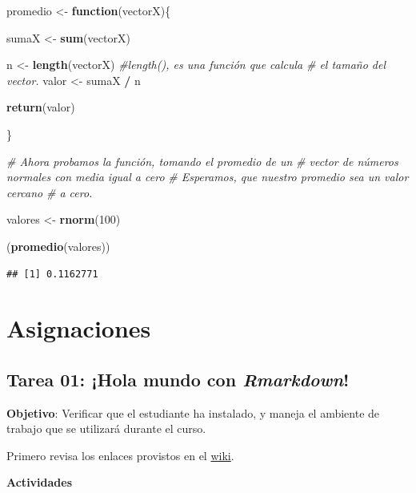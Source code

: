 \documentclass[12pt,letterpaper,]{book}
\newenvironment{Shaded}{\begin{snugshade}}{\end{snugshade}}
\newcommand{\KeywordTok}[1]{\textcolor[rgb]{0.13,0.29,0.53}{\textbf{#1}}}
\newcommand{\DecValTok}[1]{\textcolor[rgb]{0.00,0.00,0.81}{#1}}
\newcommand{\StringTok}[1]{\textcolor[rgb]{0.31,0.60,0.02}{#1}}
\newcommand{\CommentTok}[1]{\textcolor[rgb]{0.56,0.35,0.01}{\textit{#1}}}
\newcommand{\ControlFlowTok}[1]{\textcolor[rgb]{0.13,0.29,0.53}{\textbf{#1}}}
\newcommand{\OperatorTok}[1]{\textcolor[rgb]{0.81,0.36,0.00}{\textbf{#1}}}
\newcommand{\NormalTok}[1]{#1}
\begin{document}
\begin{Shaded}
\begin{Highlighting}[]
\NormalTok{promedio <-}\StringTok{ }\ControlFlowTok{function}\NormalTok{(vectorX)\{}
 
\NormalTok{   sumaX <-}\StringTok{ }\KeywordTok{sum}\NormalTok{(vectorX)}
   
\NormalTok{  n <-}\StringTok{ }\KeywordTok{length}\NormalTok{(vectorX) }\CommentTok{#length(), es una función que calcula }
                       \CommentTok{#   el tamaño del vector.}
\NormalTok{  valor <-}\StringTok{ }\NormalTok{sumaX }\OperatorTok{/}\StringTok{ }\NormalTok{n }
  
  \KeywordTok{return}\NormalTok{(valor)}
  
\NormalTok{\}}

\CommentTok{# Ahora probamos la función, tomando el promedio de un }
\CommentTok{#       vector de números normales con media igual a cero}
\CommentTok{#       Esperamos, que nuestro promedio sea un valor cercano}
\CommentTok{#         a cero.}

\NormalTok{valores <-}\StringTok{ }\KeywordTok{rnorm}\NormalTok{(}\DecValTok{100}\NormalTok{)}

\NormalTok{(}\KeywordTok{promedio}\NormalTok{(valores))}
\end{Highlighting}
\end{Shaded}

\begin{verbatim}
## [1] 0.1162771
\end{verbatim}

\chapter{Asignaciones}\label{asignaciones}

\section{\texorpdfstring{Tarea 01: ¡Hola mundo con
\emph{Rmarkdown}!}{Tarea 01: ¡Hola mundo con Rmarkdown!}}\label{tarea-01-hola-mundo-con-rmarkdown}

\textbf{Objetivo}: Verificar que el estudiante ha instalado, y maneja el
ambiente de trabajo que se utilizará durante el curso.

Primero revisa los enlaces provistos en el
\href{https://github.com/dawidh15/dinPob/wiki/02-Instalaci\%C3\%B3n-del-software-necesario\#prueba-con-rmarkdown}{wiki}.

\textbf{Actividades}
\end{document}

